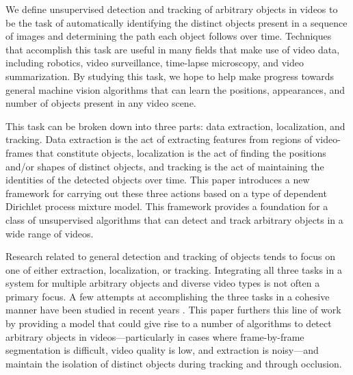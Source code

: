 \documentclass[twocolumn, final]{svjour3}
\newcommand{\willie}[1]{\textcolor{green}{\textsf{\emph{\textbf{\textcolor{green}{#1}}}}}}
\begin{document}
We define unsupervised detection and tracking of arbitrary objects in videos to be the task of automatically identifying the distinct objects present in a sequence of images and determining the path each object follows over time. Techniques that accomplish this task are useful in many fields that make use of video data, including robotics, video surveillance, time-lapse microscopy, and video summarization. By studying this task, we hope to help make progress towards general machine vision algorithms that can learn the positions, appearances, and number of objects present in any video scene.

This task can be broken down into three parts: data extraction, localization, and tracking. Data extraction is the act of extracting features from regions of video-frames that constitute objects, localization is the act of finding the positions and/or shapes of distinct objects, and tracking is the act of maintaining the identities of the detected objects over time. This paper introduces a new framework for carrying out these three actions based on a type of dependent Dirichlet process mixture model. This framework provides a foundation for a class of unsupervised algorithms that can detect and track arbitrary objects in a wide range of videos.

Research related to general detection and tracking of objects tends to focus on one of either extraction, localization, or tracking. Integrating all three tasks in a system for multiple arbitrary objects and diverse video types is not often a primary focus. A few attempts at accomplishing the three tasks in a cohesive manner have been studied in recent years \cite{brostow2006unsupervised, brox2010object, fragkiadaki2011detection, pece_2002}.
This paper furthers this line of work by providing a model that could give rise to a number of algorithms to detect arbitrary objects in videos---particularly in cases where frame-by-frame segmentation is difficult, video quality is low, and extraction is noisy---and maintain the isolation of distinct objects during tracking and through occlusion.
\end{document}
